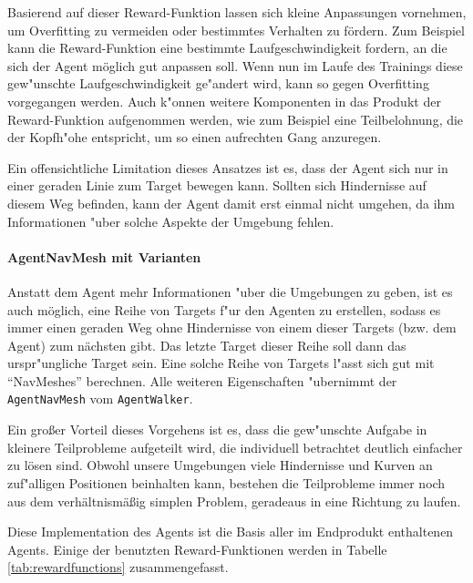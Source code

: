Basierend auf dieser Reward-Funktion lassen sich kleine Anpassungen vornehmen, um Overfitting zu vermeiden oder bestimmtes Verhalten zu fördern. Zum Beispiel kann die Reward-Funktion eine bestimmte Laufgeschwindigkeit fordern, an die sich der Agent möglich gut anpassen soll. Wenn nun im Laufe des Trainings diese gew"unschte Laufgeschwindigkeit ge"andert wird, kann so gegen Overfitting vorgegangen werden. Auch k"onnen weitere Komponenten in das Produkt der Reward-Funktion aufgenommen werden, wie zum Beispiel eine Teilbelohnung, die der Kopfh"ohe entspricht, um so einen aufrechten Gang anzuregen.

Ein offensichtliche Limitation dieses Ansatzes ist es, dass der Agent sich nur in einer geraden Linie zum Target bewegen kann. Sollten sich Hindernisse auf diesem Weg befinden, kann der Agent damit erst einmal nicht umgehen, da ihm Informationen "uber solche Aspekte der Umgebung fehlen.

\paragraph{AgentNavMesh mit Varianten}
\label{subsubsec:agentnavmesh}

Anstatt dem Agent mehr Informationen "uber die Umgebungen zu geben, ist es auch möglich, eine Reihe von Targets f"ur den Agenten zu erstellen, sodass es immer einen geraden Weg ohne Hindernisse von einem dieser Targets (bzw. dem Agent) zum nächsten gibt. Das letzte Target dieser Reihe soll dann das urspr"ungliche Target sein. Eine solche Reihe von Targets l"asst sich gut mit \enquote{NavMeshes} berechnen. Alle weiteren Eigenschaften "ubernimmt der \texttt{AgentNavMesh} vom \texttt{AgentWalker}.

Ein großer Vorteil dieses Vorgehens ist es, dass die gew"unschte Aufgabe in kleinere Teilprobleme aufgeteilt wird, die individuell betrachtet deutlich einfacher zu lösen sind. Obwohl unsere Umgebungen viele Hindernisse und Kurven an zuf"alligen Positionen beinhalten kann, bestehen die Teilprobleme immer noch aus dem verhältnismäßig simplen Problem, geradeaus in eine Richtung zu laufen.

Diese Implementation des Agents ist die Basis aller im Endprodukt enthaltenen Agents. Einige der benutzten Reward-Funktionen werden in Tabelle \ref{tab:rewardfunctions} zusammengefasst.

